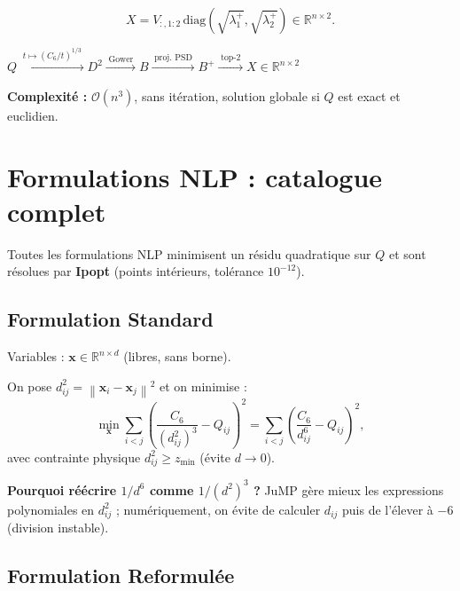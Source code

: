 \documentclass[12pt,a4paper]{article}
\newcommand{\R}{\mathbb{R}}
\newcommand{\norm}[1]{\left\|#1\right\|}
\begin{document}
\[
  X = V_{:,1:2}\,\mathrm{diag}(\sqrt{\lambda_1^+},\sqrt{\lambda_2^+})
  \in \R^{n\times 2}.
\]

\begin{tcolorbox}[pipeline, title=Pipeline MDS Rydberg (\texttt{solve\_mds})]
$Q \xrightarrow{\;t\mapsto (C_6/t)^{1/3}\;} D^2
\xrightarrow{\;\text{Gower}\;} B
\xrightarrow{\;\text{proj.\ PSD}\;} B^+
\xrightarrow{\;\text{top-2}\;} X \in \R^{n\times 2}$
\end{tcolorbox}

\textbf{Complexité :} $\mathcal{O}(n^3)$, sans itération, solution globale
si $Q$ est exact et euclidien.

\section{Formulations NLP : catalogue complet}

Toutes les formulations NLP minimisent un résidu quadratique sur $Q$
et sont résolues par \textbf{Ipopt} (points intérieurs, tolérance $10^{-12}$).

\subsection{Formulation Standard}

Variables : $\mathbf{x} \in \R^{n\times d}$ (libres, sans borne).

On pose $d_{ij}^2 = \norm{\mathbf{x}_i-\mathbf{x}_j}^2$ et on minimise :
\[
  \min_{\mathbf{x}} \sum_{i<j}\left(\frac{C_6}{(d_{ij}^2)^3} - Q_{ij}\right)^2
  = \sum_{i<j}\left(\frac{C_6}{d_{ij}^6} - Q_{ij}\right)^2,
\]
avec contrainte physique $d_{ij}^2 \geq z_{\min}$ (évite $d\to 0$).

\textbf{Pourquoi réécrire $1/d^6$ comme $1/(d^2)^3$ ?}
JuMP gère mieux les expressions polynomiales en $d_{ij}^2$ ;
numériquement, on évite de calculer $d_{ij}$ puis de l'élever à $-6$
(division instable).

\subsection{Formulation Reformulée}
\end{document}
